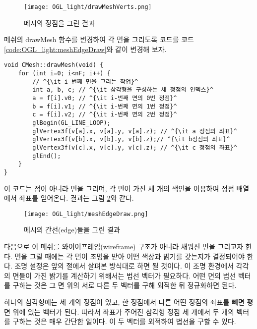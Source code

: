 \begin{figure}[h!]
  \centering
    \texttt{[image: OGL\_light/drawMeshVerts.png]}
    \caption{메시의 정점을 그린 결과}
    \label{fig:OGL_light:drawMeshVerts}
\end{figure}

메쉬의 drawMesh 함수를 변경하여 각 면을 그리도록 코드를 코드 \ref{code:OGL_light:meshEdgeDraw}와 같이 변경해 보자.

\begin{algorithmbis}\label{code:OGL_light:meshEdgeDraw}
\lstset{language=C++, escapechar=^} 
\begin{lstlisting}
void CMesh::drawMesh(void) {
    for (int i=0; i<nF; i++) {
        // ^{\it i-번째 면을 그리는 작업}^
        int a, b, c; // ^{\it 삼각형을 구성하는 세 정점의 인덱스}^
        a = f[i].v0; // ^{\it i-번째 면의 0번 정점}^
        b = f[i].v1; // ^{\it i-번째 면의 1번 정점}^
        c = f[i].v2; // ^{\it i-번째 면의 2번 정점}^
        glBegin(GL_LINE_LOOP);
        glVertex3f(v[a].x, v[a].y, v[a].z); // ^{\it a 정점의 좌표}^
        glVertex3f(v[b].x, v[b].y, v[b].z);// ^{\it b정점의 좌표}^
        glVertex3f(v[c].x, v[c].y, v[c].z); // ^{\it c 정점의 좌표}^
        glEnd();
    }
}
\end{lstlisting}
\end{algorithmbis}

이 코드는 점이 아니라 면을 그리며, 각 면이 가진 세 개의 색인을 이용하여 정점 배열에서 좌표를 얻어온다. 
결과는 그림 \ref{fig:OGL_light:meshEdgeDraw}와 같다.

\begin{figure}[h!]
  \centering
    \texttt{[image: OGL\_light/meshEdgeDraw.png]}
    \caption{메시의 간선(edge)들을 그린 결과}
    \label{fig:OGL_light:meshEdgeDraw}
\end{figure}

다음으로 이 메쉬를 와이어프레임(wireframe) 구조가 아니라 채워진 면을 그리고자 한다. 면을 그릴 때에는 각 면이 조명을 받아 어떤 색상과 밝기를 갖는지가 결정되어야 한다. 조명 설정은 앞의 절에서 살펴본 방식대로 하면 될 것이다. 이 조명 환경에서 각각의 면들이 가진 밝기를 계산하기 위해서는 법선 벡터가 필요하다. 어떤 면의 법선 벡터를 구하는 것은 그 면 위의 서로 다른 두 벡터를 구해 외적한 뒤 정규화하면 된다.

하나의 삼각형에는 세 개의 정점이 있고, 한 정점에서 다른 어떤 정점의 좌표를 빼면 평면 위에 있는 벡터가 된다. 따라서 좌표가 주어진 삼각형 정점 세 개에서 두 개의 벡터를 구하는 것은 매우 간단한 일이다. 이 두 벡터를 외적하여 법선을 구할 수 있다. 

